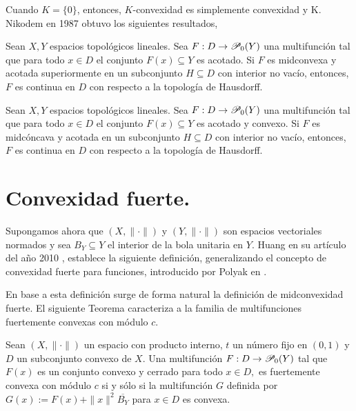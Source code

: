 Cuando $K=\{0\}$, entonces, $K$-convexidad es simplemente convexidad
y K. Nikodem en 1987 obtuvo los siguientes resultados, 
\begin{theorem}
\label{Nik87c1}
Sean $X,Y$ espacios topológicos lineales.
Sea $F:D\to \P_0(Y)$ una multifunción tal que para todo $x\in D$ el conjunto
$F(x)\subseteq Y$ es acotado. Si $F$ es midconvexa y acotada superiormente
en un subconjunto $H\subseteq D$ con interior no vacío, entonces,
$F$ es continua en $D$ con respecto a la topología de Hausdorff.
\end{theorem}

\begin{theorem}
\label{Nik87a1}
Sean $X,Y$ espacios topológicos lineales.
Sea $F:D\to \P_0(Y)$ una multifunción tal que para todo $x\in D$ el conjunto
$F(x)\subseteq Y$ es acotado y convexo. Si $F$ es midcóncava y acotada 
en un subconjunto $H\subseteq D$ con interior no vacío, entonces,
$F$ es continua en $D$ con respecto a la topología de Hausdorff.
\end{theorem}

\section{Convexidad fuerte.}
Supongamos ahora que $(X,\|\cdot\|)$ y $(Y,\|\cdot\|)$
son espacios vectoriales normados
y sea $B_Y\subseteq Y$ el interior 
de la bola unitaria en $Y$. Huang en su artículo 
del año 2010 \cite{Hua10}, establece la siguiente 
definición, generalizando el concepto de convexidad fuerte
para funciones, introducido por Polyak en \cite{Pol66}. 

En base a esta definición surge de forma natural la
definición de midconvexidad fuerte.
El siguiente Teorema caracteriza a la familia de multifunciones
fuertemente convexas con m\'odulo $c$.
\begin{theorem}
Sean $(X,\|\cdot\|)$ un espacio con producto interno, $t$
un n\'umero fijo en $(0,1)$ y $D$ un subconjunto
convexo de $X$. Una multifunci\'on $F:D\to\P_0(Y)$ tal que $F(x)$
es un conjunto convexo y cerrado para todo $x\in D,$ es 
fuertemente convexa con m\'odulo $c$ si y s\'olo si
la multifunci\'on $G$ definida por $G(x):=F(x)+\|x\|^2\overline{B_Y}$
para $x\in D$ es convexa.
\end{theorem}

